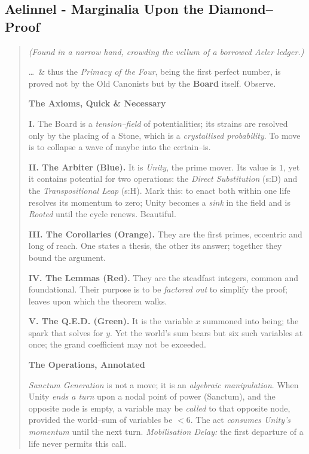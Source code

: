 \documentclass[11pt]{article}
\begin{document}
\clearpage

\subsection{Aelinnel -  Marginalia Upon the Diamond–Proof}
\begin{quote}\small\itshape
\textit{(Found in a narrow hand, crowding the vellum of a borrowed Aeler ledger.)}

\medskip
\ldots\ \& thus the \emph{Primacy of the Four}, being the first perfect number, is proved not by the Old Canonists but by the \textbf{Board} itself. Observe.

\medskip
\textbf{The Axioms, Quick \& Necessary}

\textbf{I.} The Board is a \emph{tension–field} of potentialities; its strains are resolved only by the placing of a Stone, which is a \emph{crystallised probability}. To move is to collapse a wave of maybe into the certain–is.

\textbf{II. The Arbiter (Blue).} It is \emph{Unity}, the prime mover. Its value is $1$, yet it contains potential for two operations: the \emph{Direct Substitution} (s:D) and the \emph{Transpositional Leap} (s:H). Mark this: to enact both within one life resolves its momentum to zero; Unity becomes a \emph{sink} in the field and is \emph{Rooted} until the cycle renews. Beautiful.

\textbf{III. The Corollaries (Orange).} They are the first primes, eccentric and long of reach. One states a thesis, the other its answer; together they bound the argument.

\textbf{IV. The Lemmas (Red).} They are the steadfast integers, common and foundational. Their purpose is to be \emph{factored out} to simplify the proof; leaves upon which the theorem walks.

\textbf{V. The Q.E.D. (Green).} It is the variable $x$ summoned into being; the spark that solves for $y$. Yet the world’s sum bears but six such variables at once; the grand coefficient may not be exceeded.

\medskip
\textbf{The Operations, Annotated}

\emph{Sanctum Generation} is not a move; it is an \emph{algebraic manipulation}. When Unity \emph{ends a turn} upon a nodal point of power (Sanctum), and the opposite node is empty, a variable may be \emph{called} to that opposite node, provided the world–sum of variables be $<6$. The act \emph{consumes Unity’s momentum} until the next turn. \emph{Mobilisation Delay:} the first departure of a life never permits this call.


\end{quote}
\end{document}
